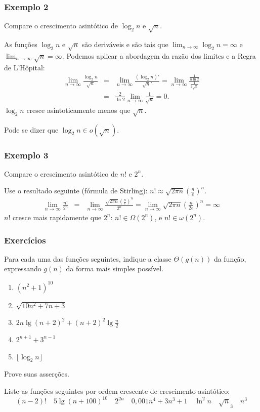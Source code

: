 \documentclass{beamer}
\begin{document}
\begin{frame}
\frametitle{Exemplo 2}
\begin{problem}
Compare o crescimento asintótico de $\log_2 n$ e $\sqrt{n}$.
\end{problem}
\pause
\begin{solution}
  As funções $\log_2 n$ e $\sqrt{n}$ são deriváveis e são tais que $\lim_{n \to
    \infty} \log_2 n = \infty$ e $\lim_{n \to \infty} \sqrt{n} =
  \infty$. Podemos aplicar a abordagem da razão dos limites e a Regra de
  L'Hôpital:
\begin{eqnarray*}
\lim_{n \to \infty} \frac{\log_2 n}{\sqrt{n}} & = & 
\lim_{n \to \infty} \frac{(\log_2 n)'}{\sqrt{n}'} = 
\lim_{n \to \infty} \frac{\frac{1}{n \ln 2}}{\frac{1}{2 \sqrt{n}}} \\
& = & \frac{2}{\ln 2} \lim_{n \to \infty} \frac{1}{\sqrt{n}} = 0.
\end{eqnarray*}
$\log_2 n$ cresce asintoticamente menos que $\sqrt{n}$.
\end{solution}
\pause
Pode se dizer que $\log_2 n \in o(\sqrt{n})$.
\end{frame}

\begin{frame}
\frametitle{Exemplo 3}
\begin{problem}
Compare o crescimento asintótico de $n!$ e $2^n$.
\end{problem}
Use o resultado seguinte (fórmula de Stirling): $n! \approx \sqrt{2 \pi n} \left( \frac{n}{e} \right)^n$.
\pause
\begin{eqnarray*}
\lim_{n \to \infty} \frac{n!}{2^n} & = & \lim_{n \to \infty} \frac{\sqrt{2 \pi n} \left( \frac{n}{e} \right)^n}{2^n} = \lim_{n \to \infty} \sqrt{2 \pi n} \left(\frac{n}{2 e}\right)^n = \infty
\end{eqnarray*}
$n!$ cresce mais rapidamente que $2^n$: $n! \in \Omega(2^n)$, e $n! \in
\omega(2^n)$.
\end{frame}

\begin{frame}
\frametitle{Exercícios}

\begin{problem}
Para cada uma das funções seguintes, indique a classe $\Theta(g(n))$ da 
função, expressando $g(n)$ da forma mais simples possível.
\begin{enumerate}
\item $(n^2+1)^{10}$
\item $\sqrt{10 n^2 + 7 n + 3}$
\item $2n \lg(n+2)^2 + (n+2)^2 \lg \frac{n}{2}$
\item $2^{n+1} + 3^{n-1}$
\item $\lfloor \log_2 n \rfloor$
\end{enumerate}
Prove suas asserções.
\end{problem}
\pause
\begin{problem}
  Liste as funções seguintes por ordem crescente de crescimento asintótico:
$$
(n-2)! \quad 5 \lg(n+100)^{10} \quad 2^{2n} \quad 0,001 n^4 + 3 n^3 + 1 \quad \ln^2 n \quad \sqrt{n}_3 \quad n^3
$$
\end{problem}


\end{frame}
\end{document}

